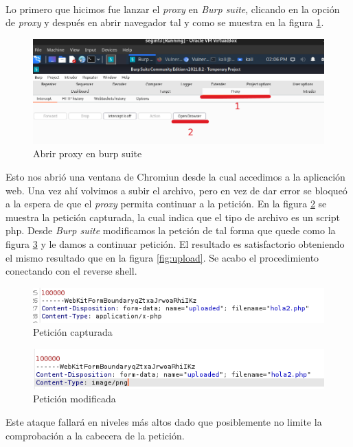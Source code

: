\paragraph{} Lo primero que hicimos fue lanzar el {\it proxy} en {\it Burp suite}, clicando en la opción de 
{\it proxy} y después en abrir navegador tal y como se muestra en la figura \ref{fig:burp}.
\begin{figure}[ht!]
    \centering
    \includegraphics[width=14cm]{img/upload/burp.png}
    \caption{Abrir proxy en burp suite}
    \label{fig:burp}
\end{figure} 
Esto nos abrió una ventana de Chromiun desde la cual accedimos a la aplicación web. Una vez ahí volvimos a subir el archivo, pero en vez
de dar error se bloqueó a la espera de que el {\it proxy} permita continuar a la petición. En la figura \ref{fig:appphp} se muestra la petición
capturada, la cual indica que el tipo de archivo es un script php. Desde {\it Burp suite} modificamos la petción de tal forma que quede como
la figura \ref{fig:mod} y le damos a continuar petición. El resultado es satisfactorio obteniendo el mismo resultado que en la figura \ref{fig:upload}. Se acabo el 
procedimiento conectando con el reverse shell.
\begin{figure}[ht!]
    \centering
    \includegraphics[width=14cm]{img/upload/appphp.png}
    \caption{Petición capturada}
    \label{fig:appphp}
\end{figure} 
\begin{figure}[ht!]
    \centering
    \includegraphics[width=14cm]{img/upload/content image.png}
    \caption{Petición modificada}
    \label{fig:mod}
\end{figure} 

Este ataque fallará en niveles más altos dado que posiblemente no limite la comprobación a la 
cabecera de la petición.

